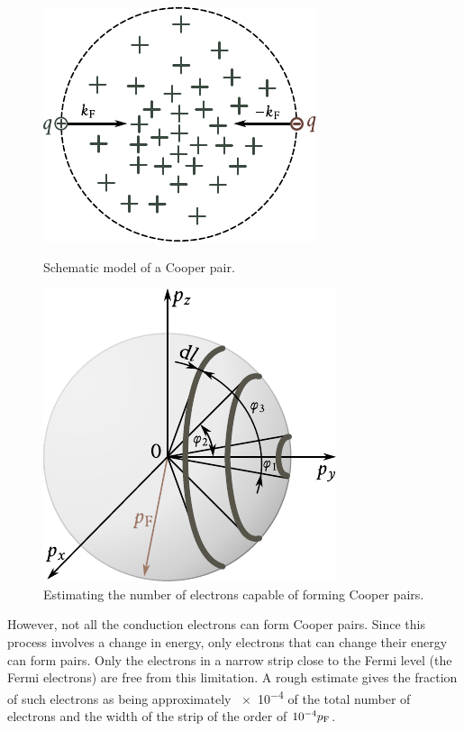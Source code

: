 \begin{figure}[!t]
	\begin{minipage}[t]{0.48\linewidth}
		\begin{center}
			\includegraphics[scale=1]{figures/ch_06/fig_6_32.pdf}
			\caption[]{Schematic model of a Cooper pair.}
			\label{fig:6_32}
		\end{center}
	\end{minipage}
	\hfill{ }%
	\begin{minipage}[t]{0.48\linewidth}
		\begin{center}
			\includegraphics[scale=1]{figures/ch_06/fig_6_33.pdf}
			\caption[]{Estimating the number of electrons capable of forming Cooper pairs.}
			\label{fig:6_33}
		\end{center}
	\end{minipage}
\vspace{-0.3cm}
\end{figure}

However, not all the conduction electrons can form Cooper pairs. Since this process involves a change in energy, only electrons that can change their energy can form pairs. Only the electrons in a narrow strip close to the Fermi level (the Fermi electrons) are free from this limitation. A rough estimate gives the fraction of such electrons as being approximately \num{e-4} of the total number of electrons and the width of the strip of the order of $\num{e-4}p_{\text{F}}$.

